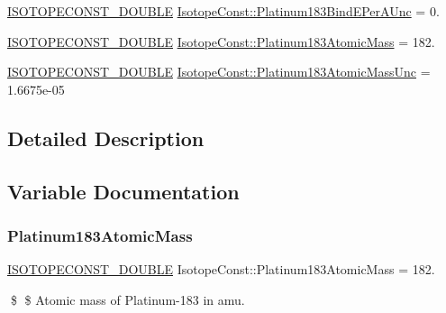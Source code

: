 \begin{DoxyCompactItemize}
\mbox{\hyperlink{group___isotope_const-_macros_ga8f45a7272ce02c0b4c65c44636ed719a}{I\+S\+O\+T\+O\+P\+E\+C\+O\+N\+S\+T\+\_\+\+D\+O\+U\+B\+LE}} \mbox{\hyperlink{group___isotope_const-_platinum-_pt183_gaf049c9255e28839c766509fa63f72993}{Isotope\+Const\+::\+Platinum183\+Bind\+E\+Per\+A\+Unc}} = 0.
\item 
\mbox{\hyperlink{group___isotope_const-_macros_ga8f45a7272ce02c0b4c65c44636ed719a}{I\+S\+O\+T\+O\+P\+E\+C\+O\+N\+S\+T\+\_\+\+D\+O\+U\+B\+LE}} \mbox{\hyperlink{group___isotope_const-_platinum-_pt183_gaa29b9c5662b6f6b9b5ab2db0300e53e7}{Isotope\+Const\+::\+Platinum183\+Atomic\+Mass}} = 182.
\item 
\mbox{\hyperlink{group___isotope_const-_macros_ga8f45a7272ce02c0b4c65c44636ed719a}{I\+S\+O\+T\+O\+P\+E\+C\+O\+N\+S\+T\+\_\+\+D\+O\+U\+B\+LE}} \mbox{\hyperlink{group___isotope_const-_platinum-_pt183_ga9116a72d030003ee9eaaa31cacd975d5}{Isotope\+Const\+::\+Platinum183\+Atomic\+Mass\+Unc}} = 1.\+6675e-\/05
\end{DoxyCompactItemize}


\subsection{Detailed Description}


\subsection{Variable Documentation}
\mbox{\label{group___isotope_const-_platinum-_pt183_gaa29b9c5662b6f6b9b5ab2db0300e53e7}} 
\subsubsection{\texorpdfstring{Platinum183\+Atomic\+Mass}{Platinum183AtomicMass}}
{\footnotesize\ttfamily \mbox{\hyperlink{group___isotope_const-_macros_ga8f45a7272ce02c0b4c65c44636ed719a}{I\+S\+O\+T\+O\+P\+E\+C\+O\+N\+S\+T\+\_\+\+D\+O\+U\+B\+LE}} Isotope\+Const\+::\+Platinum183\+Atomic\+Mass = 182.}

\$ \$ Atomic mass of Platinum-\/183 in amu. \mbox{\label{group___isotope_const-_platinum-_pt183_ga9116a72d030003ee9eaaa31cacd975d5}} 
